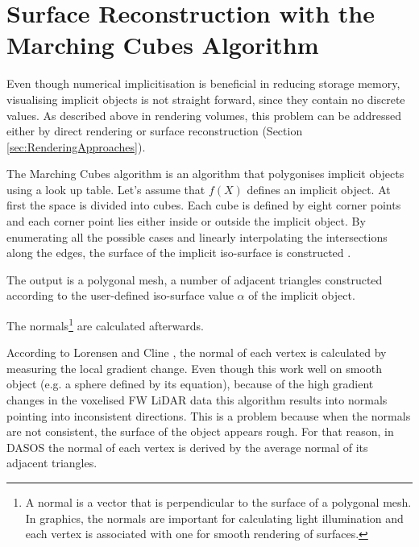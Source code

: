 \documentclass{subfiles}
\begin{document}
\section {Surface Reconstruction with the Marching Cubes Algorithm}\label{sec:SurfaceReconstruction}

\par Even though numerical implicitisation is beneficial in reducing storage memory, visualising implicit objects is not straight forward, since they contain no discrete values. As described above in rendering volumes, this problem can be addressed either by direct rendering or surface reconstruction (Section \ref{sec:RenderingApproaches}). 

\par The Marching Cubes algorithm is an algorithm that polygonises implicit objects using a look up table. Let’s assume that $f(X)$ defines an implicit object. At first the space is divided into cubes. Each cube is defined by eight corner points and each corner point lies either inside or outside the implicit object. By enumerating all the possible cases and linearly interpolating the intersections along the edges, the surface of the implicit iso-surface is constructed \cite{Lorensen1987}. {\color{Fuchsia} The output is a polygonal mesh, a number of adjacent triangles constructed according to the user-defined iso-surface value $\alpha$  of the implicit object.
	
\par  The normals\footnote{ A normal is a vector that is perpendicular to the surface of a polygonal mesh. In graphics, the normals are important for calculating light illumination and each vertex is associated with one for smooth rendering of surfaces.} are calculated afterwards.} According to Lorensen and Cline \cite{Lorensen1987}, the normal of each vertex is calculated by measuring the local gradient change. Even though this work well on smooth object (e.g. a sphere defined by its equation), because of the high gradient changes in the voxelised FW LiDAR data this algorithm results into normals pointing into inconsistent directions. This is a problem because when the normals are not consistent, the surface of the object appears rough. For that reason, in DASOS the normal of each vertex is derived by the average normal of its adjacent triangles. 
\end{document}
